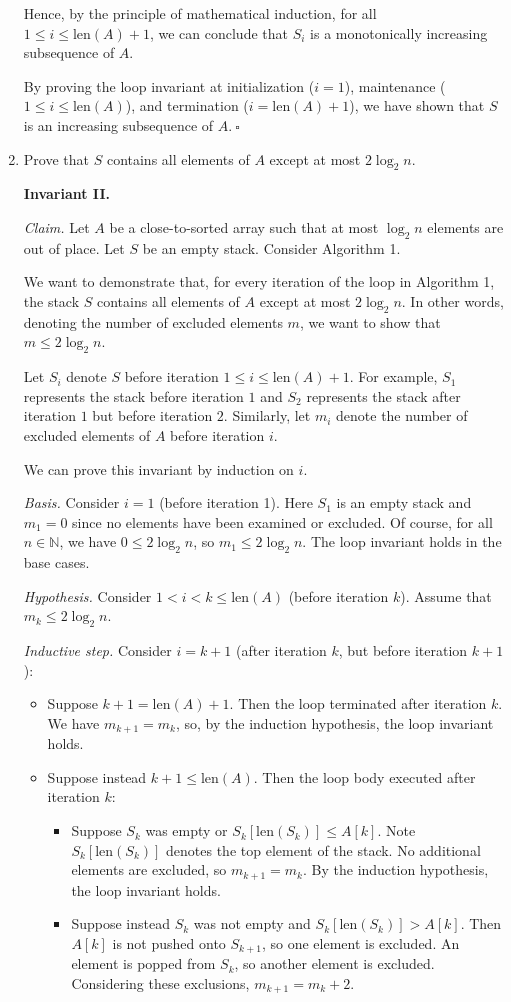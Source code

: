 \begin{enumerate}
\begin{solution}
Hence, by the principle of mathematical induction, for all $1\leq i\leq\text{len}(A)+1$, we can conclude that $S_i$ is a monotonically increasing subsequence of $A$. 

By proving the loop invariant at initialization ($i=1$), maintenance ($1\leq i\leq\text{len}(A)$), and termination ($i=\text{len}(A)+1$), we have shown that $S$ is an increasing subsequence of $A$.$~\square$
\end{solution}
\item Prove that $S$ contains all elements of $A$ except at most $2\log_2 n$.
\begin{solution}\textbf{Invariant II.}

\textit{Claim. }Let $A$ be a close-to-sorted array such that at most $\log_2n$ elements are out of place. Let $S$ be an empty stack. Consider Algorithm 1.

We want to demonstrate that, for every iteration of the loop in Algorithm 1, the stack $S$ contains all elements of $A$ except at most $2\log_2n$. In other words, denoting the number of excluded elements $m$, we want to show that $m\leq 2\log_2n$.

Let $S_i$ denote $S$ before iteration $1\leq i\leq\text{len}(A)+1$. For example, $S_1$ represents the stack before iteration $1$ and $S_2$ represents the stack after iteration $1$ but before iteration $2$. Similarly, let $m_i$ denote the number of excluded elements of $A$ before iteration $i$.

We can prove this invariant by induction on $i$.

\textit{Basis. }Consider $i=1$ (before iteration 1). Here $S_1$ is an empty stack and $m_1=0$ since no elements have been examined or excluded. Of course, for all $n\in\mathbb{N}$, we have $0\leq 2\log_2n$, so $m_1\leq 2\log_2n$. The loop invariant holds in the base cases.

\textit{Hypothesis. }Consider $1<i<k\leq\text{len}(A)$ (before iteration $k$). Assume that $m_k\leq 2\log_2 n$.

\textit{Inductive step. }Consider $i=k+1$ (after iteration $k$, but before iteration $k+1$):
\begin{itemize}
\item Suppose $k+1=\text{len}(A)+1$. Then the loop terminated after iteration $k$. We have $m_{k+1}=m_k$, so, by the induction hypothesis, the loop invariant holds.
\item Suppose instead $k+1\leq\text{len}(A)$. Then the loop body executed after iteration $k$:
\begin{itemize}
\item Suppose $S_k$ was empty or $S_k[\text{len}(S_k)]\leq A[k]$. Note $S_k[\text{len}(S_k)]$ denotes the top element of the stack. No additional elements are excluded, so $m_{k+1}=m_k$. By the induction hypothesis, the loop invariant holds.
\item Suppose instead $S_k$ was not empty and $S_k[\text{len}(S_k)]>A[k]$. Then $A[k]$ is not pushed onto $S_{k+1}$, so one element is excluded. An element is popped from $S_k$, so another element is excluded. Considering these exclusions, $m_{k+1}=m_k+2$.


\end{itemize}
\end{itemize}
\end{solution}
\end{enumerate}
